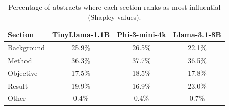 \begin{table}[t]
\centering
\caption{Percentage of abstracts where each section ranks as most influential (Shapley values).}
\label{tab:top_section}
\small
\begin{tabular}{lccc}
\toprule
\textbf{Section} & \textbf{TinyLlama-1.1B} & \textbf{Phi-3-mini-4k} & \textbf{Llama-3.1-8B} \\
\midrule
Background & 25.9\% & 26.5\% & 22.1\% \\
Method & 36.3\% & 37.7\% & 36.5\% \\
Objective & 17.5\% & 18.5\% & 17.8\% \\
Result & 19.9\% & 16.9\% & 23.0\% \\
Other & 0.4\% & 0.4\% & 0.7\% \\
\bottomrule
\end{tabular}
\end{table}